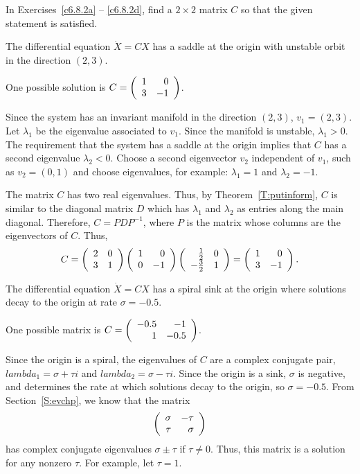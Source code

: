 \documentclass{ximera}
\begin{document}
\noindent In Exercises~\ref{c6.8.2a} -- \ref{c6.8.2d}, find a $2\times 2$
matrix $C$ so that the given statement is satisfied.
\begin{exercise} \label{c6.8.2a}
The differential equation $\dot{X}=CX$ has a saddle at the origin with
unstable orbit in the direction $(2,3)$.

\begin{solution}

\ans One possible solution is $C = \left(\begin{array}{rr} 1 & 0\\ 3 &-1\end{array}\right)$.

\soln Since the system has an invariant manifold in the direction $(2,3)$,
$v_1 = (2,3)$.  Let $\lambda_1$ be the eigenvalue associated to $v_1$.
Since the manifold is unstable, $\lambda_1 > 0$.  The requirement
that the system has a saddle at the origin implies that $C$ has a second
eigenvalue $\lambda_2 < 0$.  Choose a second eigenvector $v_2$ independent
of $v_1$, such as $v_2 = (0,1)$ and choose eigenvalues, for example:
$\lambda_1 = 1$ and $\lambda_2 = -1$.

\para The matrix $C$ has two real eigenvalues.  Thus, by
Theorem~\ref{T:putinform}, $C$ is similar
to the diagonal matrix $D$ which has $\lambda_1$ and $\lambda_2$ as
entries along the main diagonal.  Therefore, $C = PDP^{-1}$, where $P$
is the matrix whose columns are the eigenvectors of $C$.  Thus,
\[
C = \left(\begin{array}{rr} 2 & 0\\ 3 &1\end{array}\right)\left(\begin{array}{rr} 1 & 0\\ 0 &-1\end{array}\right)\left(\begin{array}{rr} \frac{1}{2} & 0\\ -\frac{3}{2} &1\end{array}\right) = \left(\begin{array}{rr} 1 & 0\\ 3 &-1\end{array}\right). \]

\end{solution}
\end{exercise}
\begin{exercise} \label{c6.8.2b}
The differential equation $\dot{X}=CX$ has a spiral sink at the origin
where solutions decay to the origin at rate $\sigma=-0.5$.

\begin{solution}

\ans One possible matrix is $C = \left(\begin{array}{rr} -0.5 & -1\\ 1 &-0.5\end{array}\right)$.

\soln Since the origin is a spiral, the eigenvalues of $C$ are a complex
conjugate pair, $lambda_1 = \sigma + \tau i$ and $lambda_2 = \sigma -
\tau i$.  Since the origin is a sink, $\sigma$ is negative, and determines
the rate at which solutions decay to the origin, so $\sigma = -0.5$.
From Section~\ref{S:evchp}, we know that the matrix
\[ \left(\begin{array}{rr} \sigma & -\tau\\ \tau &\sigma\end{array}\right) \]
has complex conjugate eigenvalues $\sigma \pm \tau$ if $\tau \neq 0$.
Thus, this matrix is a solution for any nonzero $\tau$.  For example,
let $\tau = 1$.

\end{solution}
\end{exercise}
\end{document}
